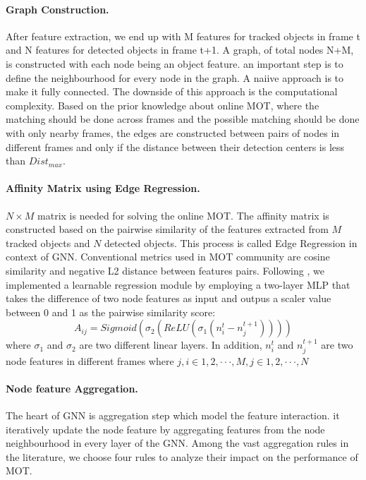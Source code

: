 \documentclass[10pt,twocolumn,letterpaper]{article}
\begin{document}
\paragraph{Graph Construction.}
After feature extraction, we end up with M features for tracked objects in frame t and N features for detected objects in frame t+1. A graph, of total nodes N+M, is constructed with each node being an object feature. an important step is to define the neighbourhood for every node in the graph. A naiive approach is to make it fully connected. The downside of this approach is the computational complexity. Based on the prior knowledge about online MOT, where the matching should be done across frames and the possible matching should be done with only nearby frames, the edges are constructed between pairs of nodes in different frames and only if the distance between their detection centers is less than $Dist_{max}$.

\paragraph{Affinity Matrix using Edge Regression.}
$N \times M$ matrix is needed for solving the online MOT.  The affinity matrix is constructed based on the pairwise similarity of the features extracted from $M$ tracked objects and $N$ detected objects. This process is called Edge Regression in context of GNN. Conventional metrics used in MOT community are cosine similarity and negative L2 distance between features pairs. Following \cite{weng2020gnn3dmot}, we implemented a learnable regression module by employing a two-layer MLP that takes the difference of two node features as input and outpus a scaler value between 0 and 1 as the pairwise similarity score: 
\begin{equation}
A_{ij} = Sigmoid(\sigma_{2}(ReLU(\sigma_{1}(n^{t}_{i} - n^{t+1}_{j}))))
\end{equation}
where $\sigma_{1}$ and $\sigma_{2}$ are two different linear layers. In addition, $n^{t}_{i}$ and $n^{t+1}_{j}$ are two node features in different frames where $j, i \in {1, 2, ···, M}, j \in {1, 2, ···, N}$
\paragraph{Node feature Aggregation.} The heart of GNN is aggregation step which model the feature interaction. it iteratively update the node feature by aggregating features from the node neighbourhood in every layer of the GNN. Among the vast aggregation rules in the literature, we choose four rules to analyze their impact on the performance of MOT.
\end{document}
